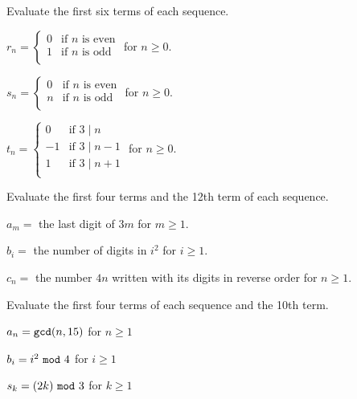 \begin{exer}[\exerU] %
\label{exer_eval_seq_piecewise} 
    Evaluate the first six terms of each sequence.
        \begin{exerpart}
             \item $r_n = \left\{ \begin{array} {cl} 0 & \text{if } n\text{ is even} \\ 1 & \text{if } n \text{ is odd} \\ \end{array} \right.$ for $n \ge 0$.
             \item $s_n = \left\{ \begin{array} {cl} 0 & \text{if } n \text{ is even} \\ n & \text{if } n \text{ is odd} \\ \end{array} \right.$ for $n \ge 0$.
             \item $t_n = \left\{ \begin{array} {cl} 0 & \text{if } 3 \mid n \\ -1 & \text{if } 3 \mid n-1  \\ 1 & \text{if } 3 \mid n+1 \\  \end{array} \right.$ for $n \ge 0$.
        \end{exerpart}
\end{exer}

\begin{exer}[\exerU] %
\label{exer_eval_seq_words}
    Evaluate the first four terms and the 12th term of each sequence.
        \begin{exerpart}
            \item $a_m=$ the last digit of $3m$ for $m \ge 1$.
            \item $b_i=$ the number of digits in $i^2$ for $i \ge 1$.
            \item $c_n =$ the number $4n$ written with its digits in reverse order for $n \ge 1$.
        \end{exerpart}
\end{exer}

\begin{exer}[\exerU] %
\label{exer_eval_seq_numberthy_functions}
    Evaluate the first four terms of each sequence and the 10th term.
        \begin{exerpart}
            \item $a_n = \texttt{gcd}(n,15)$ for $n \ge 1$
            \item $b_i = i^2 ~\texttt{mod}~ 4$ for $i \ge 1$
            \item $s_k = (2k) ~\texttt{mod}~ 3$  for $k \ge 1$
        \end{exerpart}
\end{exer}

